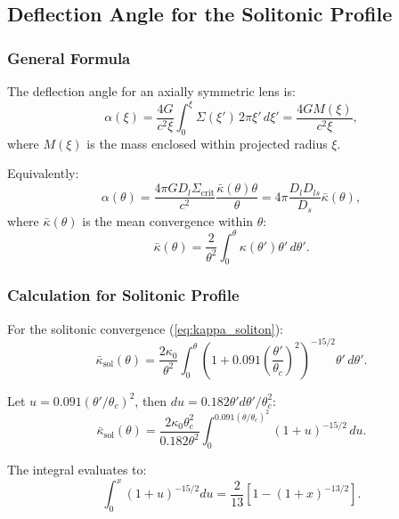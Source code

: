 \documentclass[11pt,a4paper]{article}
\theoremstyle{definition}
\theoremstyle{remark}
\begin{document}
\subsection{Deflection Angle for the Solitonic Profile}
\label{sec:deflection_soliton}

\subsubsection{General Formula}

The deflection angle for an axially symmetric lens is:
\begin{equation}
\label{eq:deflection_axial}
\alpha(\xi) = \frac{4G}{c^2 \xi} \int_0^\xi \Sigma(\xi') \, 2\pi\xi' \, d\xi' = \frac{4G M(\xi)}{c^2 \xi},
\end{equation}
where $M(\xi)$ is the mass enclosed within projected radius $\xi$.

Equivalently:
\begin{equation}
\alpha(\theta) = \frac{4\pi G D_l \Sigma_{\mathrm{crit}}}{c^2} \frac{\bar{\kappa}(\theta) \theta}{\theta} = 4\pi \frac{D_l D_{ls}}{D_s} \bar{\kappa}(\theta),
\end{equation}
where $\bar{\kappa}(\theta)$ is the mean convergence within $\theta$:
\begin{equation}
\bar{\kappa}(\theta) = \frac{2}{\theta^2} \int_0^\theta \kappa(\theta') \theta' \, d\theta'.
\end{equation}

\subsubsection{Calculation for Solitonic Profile}

For the solitonic convergence (\ref{eq:kappa_soliton}):
\begin{equation}
\bar{\kappa}_{\mathrm{sol}}(\theta) = \frac{2\kappa_0}{\theta^2} \int_0^\theta \left(1 + 0.091 \left(\frac{\theta'}{\theta_c}\right)^2\right)^{-15/2} \theta' \, d\theta'.
\end{equation}

Let $u = 0.091(\theta'/\theta_c)^2$, then $du = 0.182 \theta' d\theta'/\theta_c^2$:
\begin{equation}
\bar{\kappa}_{\mathrm{sol}}(\theta) = \frac{2\kappa_0 \theta_c^2}{0.182 \theta^2} \int_0^{0.091(\theta/\theta_c)^2} (1 + u)^{-15/2} \, du.
\end{equation}

The integral evaluates to:
\begin{equation}
\int_0^x (1+u)^{-15/2} du = \frac{2}{13}\left[1 - (1+x)^{-13/2}\right].
\end{equation}
\end{document}

